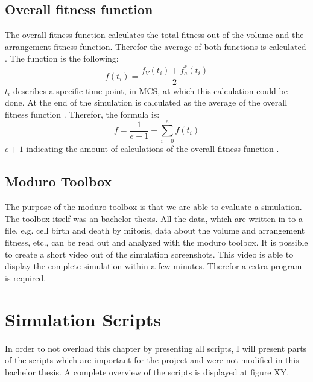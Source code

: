 \subsection{Overall fitness function}
The overall fitness function calculates the total fitness out of the volume and the arrangement fitness function. Therefor the average of both functions is calculated \cite{Torelli2017}. The function is the following:
\begin{equation} 
f(t_{i}) = \dfrac{f_{V}(t_{i})+f_{a}^{*}(t_{i})}{2}
\end{equation}
$t_{i}$ describes a specific time point, in \ac{MCS}, at which this calculation could be done. At the end of the simulation is calculated as the average of the overall fitness function \cite{Torelli2017}. Therefor, the formula is:
\begin{equation} 
f = \dfrac{1}{e+1} + \sum_{i=0}^{e}{f(t_{i})}
\end{equation}
$e+1$ indicating the amount of calculations of the overall fitness function \cite{Torelli2017}.



\subsection{Moduro Toolbox}
The purpose of the moduro toolbox is that we are able to evaluate a simulation. The toolbox itself was an bachelor thesis. All the data, which are written in to a file, e.g. cell birth and death by mitosis, data about the volume and arrangement fitness, etc., can be read out and analyzed with the moduro toolbox.
It is possible to create a short video out of the simulation screenshots. This video is able to display the complete simulation within a few minutes. Therefor a extra program is required.




\section{Simulation Scripts}
In order to not overload this chapter by presenting all scripts, I will present parts of the scripts which are important for the project and were not modified in this bachelor thesis. A complete overview of the scripts is displayed at figure XY.

